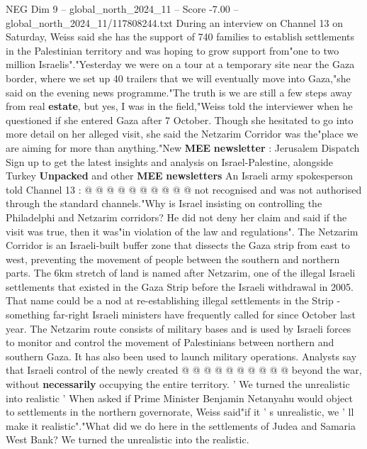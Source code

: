 \begin{textsample}{NEG Dim 9 – global\_north\_2024\_11 – Score -7.00 – global\_north\_2024\_11/117808244.txt}  \label{ex:f9_neg_046}
During an interview on Channel 13 on Saturday, Weiss said she has the support of 740 families to establish settlements in the Palestinian territory and was hoping to grow support from"one to two million Israelis"."Yesterday we were on a tour at a temporary site near the Gaza border, where we set up 40 trailers that we will eventually move into Gaza,"she said on the evening news programme."The truth is we are still a few steps away from real \textbf{estate}, but yes, I was in the field,"Weiss told the interviewer when he questioned if she entered Gaza after 7 October.
Though she hesitated to go into more detail on her alleged visit, she said the Netzarim Corridor was the"place we are aiming for more than anything."New \textbf{MEE} \textbf{newsletter} : Jerusalem Dispatch Sign up to get the latest insights and analysis on Israel-Palestine, alongside Turkey \textbf{Unpacked} and other \textbf{MEE} \textbf{newsletters} An Israeli army spokesperson told Channel 13 : @ @ @ @ @ @ @ @ @ @ not recognised and was not authorised through the standard channels."Why is Israel insisting on controlling the Philadelphi and Netzarim corridors?
He did not deny her claim and said if the visit was true, then it was"in violation of the law and regulations".
The Netzarim Corridor is an Israeli-built buffer zone that dissects the Gaza strip from east to west, preventing the movement of people between the southern and northern parts.
The 6km stretch of land is named after Netzarim, one of the illegal Israeli settlements that existed in the Gaza Strip before the Israeli withdrawal in 2005.
That name could be a nod at re-establishing illegal settlements in the Strip - something far-right Israeli ministers have frequently called for since October last year.
The Netzarim route consists of military bases and is used by Israeli forces to monitor and control the movement of Palestinians between northern and southern Gaza.
It has also been used to launch military operations.
Analysts say that Israeli control of the newly created @ @ @ @ @ @ @ @ @ @ beyond the war, without \textbf{necessarily} occupying the entire territory. ' We turned the unrealistic into realistic ' When asked if Prime Minister Benjamin Netanyahu would object to settlements in the northern governorate, Weiss said"if it ' s unrealistic, we ' ll make it realistic"."What did we do here in the settlements of Judea and Samaria West Bank?
We turned the unrealistic into the realistic.

\end{textsample}
